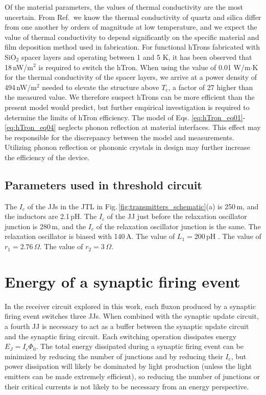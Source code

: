 \documentclass[aip,amsmath,amssymb,reprint,nofootinbib]{revtex4-1}
\begin{document}
Of the material parameters, the values of thermal conductivity are the most uncertain. From Ref.\, we know the thermal conductivity of quartz and silica differ from one another by orders of magnitude at low temperature, and we expect the value of thermal conductivity to depend significantly on the specific material and film deposition method used in fabrication. For functional hTrons fabricated with SiO$_2$ spacer layers and operating between 1 and 5 K, it has been observed \cite{mcve2019} that 18\,nW/\textmu m$^2$ is required to switch the hTron. When using the value of 0.01 W/m$\cdot$K for the thermal conductivity of the spacer layers, we arrive at a power density of 494\,nW/\textmu m$^2$ needed to elevate the structure above $T_{\mathrm{c}}$, a factor of 27 higher than the measured value. We therefore suspect hTrons can be more efficient than the present model would predict, but further empirical investigation is required to determine the limits of hTron efficiency. The model of Eqs. \ref{eq:hTron_eq01}-\ref{eq:hTron_eq04} neglects phonon reflection at material interfaces. This effect may be responsible for the discrepancy between the model and measurements. Utilizing phonon reflection or phononic crystals in design may further increase the efficiency of the device.

\subsection{Parameters used in threshold circuit}
The $I_c$ of the JJs in the JTL in Fig.\,\ref{fig:transmitters_schematic}(a) is 250\,\textmu m, and the inductors are 2.1\,pH. The $I_c$ of the JJ just before the relaxation oscillator junction is 280\,\textmu m, and the $I_c$ of the relaxation oscillator junction is the same. The relaxation oscillator is biased with 140\,\textmu A. The value of $L_1 = 200$\,pH . The value of $r_1 = 2.76$\,$\Omega$. The value of $r_2 = 3$\,$\Omega$.

\section{\label{sec:appendix_energy}Energy of a synaptic firing event}
In the receiver circuit explored in this work, each fluxon produced by a synaptic firing event switches three JJs. When combined with the synaptic update circuit, a fourth JJ is necessary to act as a buffer between the synaptic update circuit and the synaptic firing circuit. Each switching operation dissipates energy $E_{J} = I_{\mathrm{c}} \Phi_{0}$. The total energy dissipated during a synaptic firing event can be minimized by reducing the number of junctions and by reducing their $I_{\mathrm{c}}$, but power dissipation will likely be dominated by light production (unless the light emitters can be made extremely efficient), so reducing the number of junctions or their critical currents is not likely to be necessary from an energy perspective. 
\end{document}
